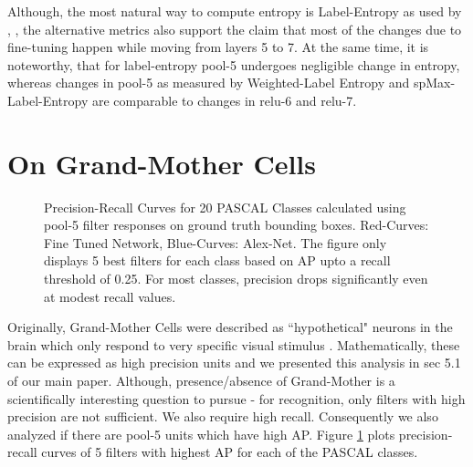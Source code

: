 \documentclass[runningheads]{llncs}
\begin{document}
Although, the most natural way to compute entropy is Label-Entropy as used by \cite{Breiman}, \cite{AmitGeman}, the alternative metrics also support the claim that most of the changes due to fine-tuning happen while moving from layers 5 to 7. At the same time, it is noteworthy, that for label-entropy pool-5 undergoes negligible change in entropy, whereas changes in pool-5 as measured by Weighted-Label Entropy and spMax-Label-Entropy are comparable to changes in relu-6 and relu-7.

\section{On Grand-Mother Cells}
\begin{figure}[t!]
\centering
{}
\caption{Precision-Recall Curves for 20 PASCAL Classes calculated using pool-5 filter responses on ground truth bounding boxes. Red-Curves: Fine Tuned Network, Blue-Curves: Alex-Net. The figure only displays 5 best filters for each class based on AP  upto a recall threshold of 0.25. For most classes, precision drops significantly even at modest recall values.}
\label{fig:ap}
\end{figure}

Originally, Grand-Mother Cells were described as ``hypothetical" neurons in the brain which only respond to very specific visual stimulus \cite{Barlow} \cite{Grandmother}. Mathematically, these can be expressed as high precision units and we presented this analysis in sec 5.1 of our main paper. Although, presence/absence of Grand-Mother is a scientifically  interesting question to pursue - for recognition, only filters with high precision are not sufficient. We also require high recall. Consequently we also analyzed if there are pool-5 units which have high AP. Figure \ref{fig:ap} plots precision-recall curves of 5 filters with highest AP for each of the PASCAL classes.
\end{document}
